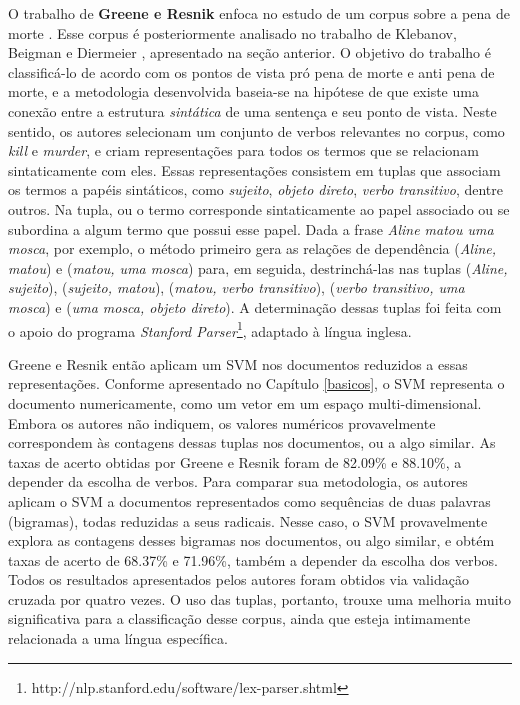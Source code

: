 O trabalho de \textbf{Greene e Resnik} enfoca no estudo de um corpus sobre a pena de morte \cite{greene}. Esse corpus é posteriormente analisado no trabalho de Klebanov, Beigman e Diermeier \cite{klebanov}, apresentado na seção anterior. O objetivo do trabalho é classificá-lo de acordo com os pontos de vista pró pena de morte e anti pena de morte, e a metodologia desenvolvida baseia-se na hipótese de que existe uma conexão entre a estrutura \emph{sintática} de uma sentença e seu ponto de vista. Neste sentido, os autores selecionam um conjunto de verbos relevantes no corpus, como \emph{kill} e \emph{murder}, e criam representações para todos os termos que se relacionam sintaticamente com eles. Essas representações consistem em tuplas que associam os termos a papéis sintáticos, como \emph{sujeito}, \emph{objeto direto}, \emph{verbo transitivo}, dentre outros. Na tupla, ou o termo corresponde sintaticamente ao papel associado ou se subordina a algum termo que possui esse papel. Dada a frase \emph{Aline matou uma mosca}, por exemplo, o método primeiro gera as relações de dependência (\emph{Aline, matou}) e (\emph{matou, uma mosca}) para, em seguida, destrinchá-las nas tuplas (\emph{Aline, sujeito}), (\emph{sujeito, matou}), (\emph{matou, verbo transitivo}), (\emph{verbo transitivo, uma mosca}) e (\emph{uma mosca, objeto direto}). A determinação dessas tuplas foi feita com o apoio do programa \emph{Stanford Parser}\footnote{http://nlp.stanford.edu/software/lex-parser.shtml}, adaptado à língua inglesa. 

Greene e Resnik então aplicam um SVM nos documentos reduzidos a essas representações. Conforme apresentado no Capítulo \ref{basicos}, o SVM representa o documento numericamente, como um vetor em um espaço multi-dimensional. Embora os autores não indiquem, os valores numéricos provavelmente correspondem às contagens dessas tuplas nos documentos, ou a algo similar. As taxas de acerto obtidas por Greene e Resnik foram de 82.09\% e 88.10\%, a depender da escolha de verbos. Para comparar sua metodologia, os autores aplicam o SVM a documentos representados como sequências de duas palavras (bigramas), todas reduzidas a seus radicais. Nesse caso, o SVM provavelmente explora as contagens desses bigramas nos documentos, ou algo similar, e obtém taxas de acerto de 68.37\% e 71.96\%, também a depender da escolha dos verbos. Todos os resultados apresentados pelos autores foram obtidos via validação cruzada por quatro vezes. O uso das tuplas, portanto, trouxe uma melhoria muito significativa para a classificação desse corpus, ainda que esteja intimamente relacionada a uma língua específica.

